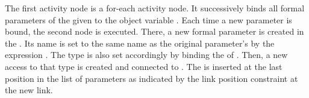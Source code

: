 The first activity node is a for-each activity node. It successively binds all formal parameters of the given  to the object variable . Each time a new parameter is bound, the second node is executed. There, a new formal parameter  is created in the . Its name is set to the same name as the original parameter's by the expression . The type is also set accordingly by binding the  of . Then, a new access to that type is created and connected to . The  is inserted at the last position in the list of parameters as indicated by the link position constraint  at the new  link.